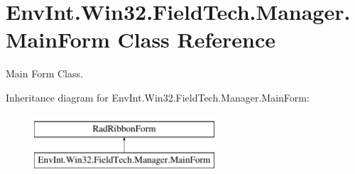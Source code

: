 \hypertarget{class_env_int_1_1_win32_1_1_field_tech_1_1_manager_1_1_main_form}{}\section{Env\+Int.\+Win32.\+Field\+Tech.\+Manager.\+Main\+Form Class Reference}
\label{class_env_int_1_1_win32_1_1_field_tech_1_1_manager_1_1_main_form}


Main Form Class.  


Inheritance diagram for Env\+Int.\+Win32.\+Field\+Tech.\+Manager.\+Main\+Form\+:\begin{figure}[H]
\begin{center}
\leavevmode
\includegraphics[height=2.000000cm]{class_env_int_1_1_win32_1_1_field_tech_1_1_manager_1_1_main_form}
\end{center}
\end{figure}
